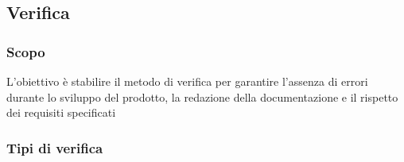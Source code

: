 
\subsection{Verifica}
\subsubsection{Scopo}
L'obiettivo è stabilire il metodo di verifica per garantire l'assenza
di errori durante lo sviluppo del prodotto, la redazione della documentazione
e il rispetto dei requisiti specificati
\subsubsection{Tipi di verifica}



